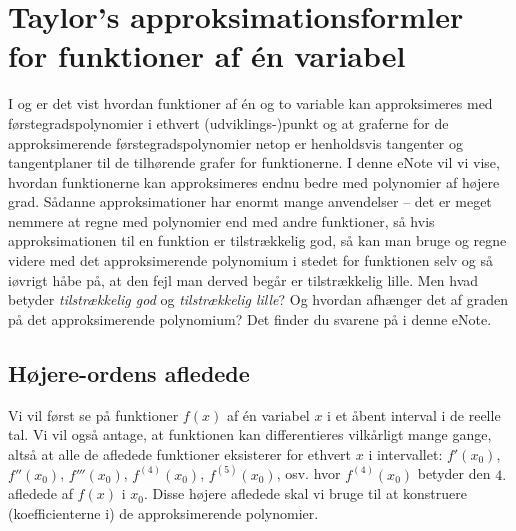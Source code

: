
\setcounter{chapter}{16} %
%

\chapter{Taylor's approksimationsformler for funktioner af én variabel} \label{tn17}

\begin{basis}
 I  og  er det vist  hvordan funktioner af \'{e}n og to variable kan approksimeres med førstegradspolynomier i ethvert (udviklings-)punkt og at graferne for de approksimerende førstegradspolynomier netop er henholdsvis tangenter og tangentplaner til de tilhørende grafer for funktionerne. I denne eNote vil vi vise, hvordan funktionerne kan approksimeres endnu bedre med polynomier af højere grad. Sådanne approksimationer har enormt mange anvendelser -- det er meget nemmere at regne med polynomier end med andre funktioner, så hvis approksimationen til en funktion er tilstrækkelig god, så kan man bruge og regne videre med det approksimerende polynomium i stedet for funktionen selv og så iøvrigt håbe på, at den fejl man derved begår er tilstrækkelig lille. Men hvad betyder {\emph{tilstrækkelig god}} og {\emph{tilstrækkelig lille}}? Og hvordan afhænger det af graden på det approksimerende polynomium? Det finder du svarene på i denne eNote.
\end{basis}




\section{Højere-ordens afledede} \label{secTaylor1}
Vi vil først se på funktioner $f(x)$ af \'{e}n variabel $x$ i et åbent interval i de reelle tal. Vi vil også antage, at funktionen kan differentieres vilkårligt mange gange, altså at alle de afledede funktioner eksisterer for ethvert $x$ i intervallet: $f'(x_{0})$, $f''(x_{0})$, $f'''(x_{0})$, $f^{(4)}(x_{0})$, $f^{(5)}(x_{0})$, osv. hvor $f^{(4)}(x_{0})$ betyder den $4.$ afledede af $f(x)$ i $x_{0}$. Disse højere afledede skal vi bruge til at konstruere (koefficienterne i) de approksimerende polynomier.

